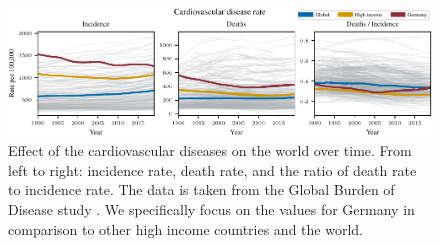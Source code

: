 \begin{figure}[h]
    \vskip 0.2in
    \centering
    \centerline{\includegraphics[]{fig/fig_cardiovascular_disease_rate.pdf}}
    \caption{Effect of the cardiovascular diseases on the world over time. From left to right: incidence rate, death rate, 
    and the ratio of death rate to incidence rate. The data is taken from the Global Burden of Disease study \citep{GBD2019}. We specifically focus on the values 
    for Germany in comparison to other high income countries and the world.}
    \label{Cardiovascular diseases over time}
\end{figure}